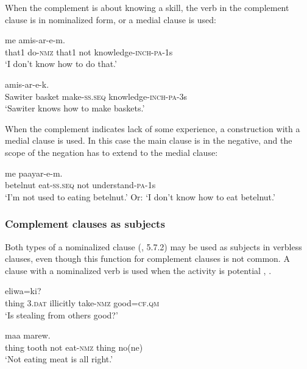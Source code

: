 When the complement is about knowing a skill, the verb in the complement clause is in nominalized form, or a medial clause is used: 

\ea%
\label{ex:8:x1603}
  me  amis-ar-e-m.\\
that1  do-\textsc{nmz} that1 not knowledge-\textsc{inch}-\textsc{pa}-1s\\
\glt`I don't know how to do that.'
\z


\ea%
\label{ex:8:x1849}
  amis-ar-e-k.\\
Sawiter  basket  make-\textsc{ss}.\textsc{seq} knowledge-\textsc{inch}-\textsc{pa}-3s\\
\glt`Sawiter knows how to make baskets.'
\z


When the complement indicates lack of some experience, a construction with a medial clause is used. In this case the main clause is in the negative, and the scope of the negation has to extend to the medial clause:

\ea%
\label{ex:8:x1604}
\gll [Owora  en-ep]  me  paayar-e-m.\\
betelnut  eat-\textsc{ss}.\textsc{seq} not understand-\textsc{pa}-1s\\
\glt`I'm not used to eating betelnut.' Or: `I don't know how to eat betelnut.'
\z


\subsubsection{Complement clauses as subjects}

Both types of a nominalized clause (, 5.7.2) may be used as subjects in verbless clauses, even though this function for complement clauses is not common. A clause with a nominalized verb is used when the activity is potential , . 

\ea%
\label{ex:8:x1636}
  eliwa=ki? \\
thing  3.\textsc{dat} illicitly take-\textsc{nmz} good=\textsc{cf}.\textsc{qm}\\
\glt`Is stealing from others good?'
\z


\ea%
\label{ex:8:x1637}
  maa  marew.\\
thing  tooth  not  eat-\textsc{nmz} thing  no(ne)\\
\glt`Not eating meat is all right.'
\z


